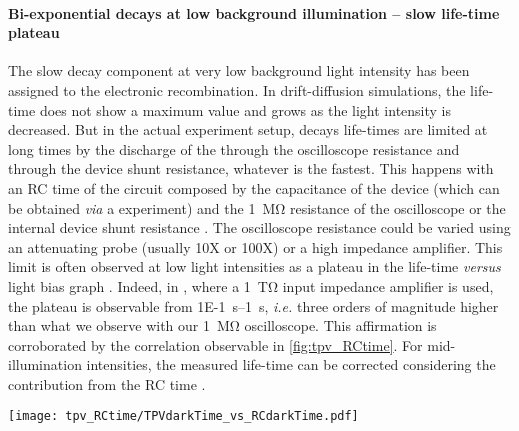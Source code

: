 	\paragraph{Bi-exponential decays at low background illumination -- slow life-time plateau}
	The slow decay component at very low background light intensity has been assigned to the electronic recombination.
	In drift-diffusion simulations, the life-time does not show a maximum value and grows as the light intensity is decreased.
	But in the actual experiment setup, decays life-times are limited at long times by the discharge of the through the oscilloscope resistance and through the device shunt resistance, whatever is the fastest.
	This happens with an RC time of the circuit composed by the capacitance of the device (which can be obtained \textsl{via} a  experiment) and the \SI{1}{\Mohm} resistance of the oscilloscope or the internal device shunt resistance \cite{Tvingstedt2017}.
	The oscilloscope resistance could be varied using an attenuating probe (usually 10X or 100X) or a high impedance amplifier.
	This limit is often observed at low light intensities as a plateau in the  life-time \textsl{versus} light bias graph \cite{Tvingstedt2017}.
	Indeed, in , where a \SI{1}{\tera\ohm} input impedance amplifier is used, the plateau is observable from \SIrange{1E-1}{1}{\s}, \textsl{i.e.} three orders of magnitude higher than what we observe with our \SI{1}{\Mohm} oscilloscope.
	This affirmation is corroborated by the correlation observable in \cref{fig:tpv_RCtime}.
	For mid-illumination intensities, the measured life-time can be corrected considering the contribution from the RC time \cite{Credgington2014}.

	\begin{SCfigure}
		\centering
		\texttt{[image: tpv\_RCtime/TPVdarkTime\_vs\_RCdarkTime.pdf]}
		\label{fig:tpv_RCtime}
	\end{SCfigure}

